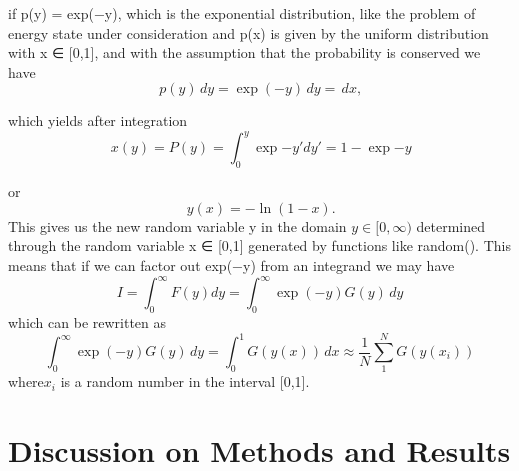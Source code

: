 \documentclass[9pt,a4paper,titlepage]{article}
\begin{document}
if 
p(y) = exp(−y),
which is the exponential distribution, like the problem of energy state under consideration and  p(x) is given by the uniform distribution with x ∈ [0,1], and with the assumption that
the probability is conserved we have
\begin{equation}
\,p(y)\,dy = \exp(−y)\,dy = \,dx,
\end{equation}

which yields after integration
\begin{equation}
\,x(y) = P(y) =\int_{0}^{y}\exp{-y'}dy'=1-\exp{-y}
\end{equation}

or
\begin{equation}
\,y(x) = −\ln(1−x).
\end{equation}
This gives us the new random variable y in the domain $y ∈ [0,\infty)$ determined through the
random variable x ∈ [0,1] generated by functions like random().
This means that if we can factor out exp(−y) from an integrand we may have
\begin{equation}
I =\int_{0}^{\infty}F(y)dy = \int_{0}^{\infty}\exp(−y)G(y)\,dy
\end{equation}
which can be rewritten as
\begin{equation}
 \int_{0}^{\infty}\exp(−y)G(y)\,dy = \int_{0}^{1}G(y(x))\,dx \approx \frac{1}{N}\sum_{1}^{N}G(y(x_i))
\end{equation}
where$ x_i$ is a random number in the interval [0,1].

\section{Discussion on Methods and Results}
\end{document}
